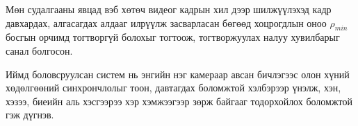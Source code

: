 Мөн судалгааны явцад вэб хөтөч видеог кадрын хил дээр шилжүүлэхэд кадр давхардах, алгасагдах алдааг илрүүлж засварласан бөгөөд хоцрогдлын оноо \(\rho_{min}\) босгын орчимд тогтворгүй болохыг тогтоож, тогтворжуулах налуу хувилбарыг санал болгосон.

Иймд боловсруулсан систем нь энгийн нэг камераар авсан бичлэгээс олон хүний хөдөлгөөний синхрончлолыг тоон, давтагдах боломжтой хэлбэрээр үнэлж, хэн, хэзээ, биеийн аль хэсгээрээ хэр хэмжээгээр зөрж байгааг тодорхойлох боломжтой гэж дүгнэв.
